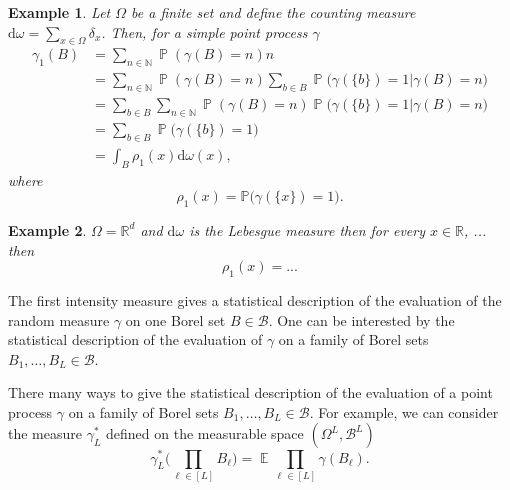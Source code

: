 \documentclass[twoside,11pt]{book}
\newtheorem{example}{Example}
\numberwithin{theorem}{chapter}
\numberwithin{definition}{chapter}
\numberwithin{proposition}{chapter}
\numberwithin{corollary}{chapter}
\numberwithin{example}{chapter}
\numberwithin{lemma}{chapter}
\DeclareMathOperator{\EX}{\mathbb{E}}
\DeclareMathOperator{\Prb}{\mathbb{P}}
\begin{document}
\begin{example}
Let $\Omega$ be a finite set and define the counting measure $\mathrm{d}\omega = \sum\limits_{x \in \Omega} \delta_x$. Then, for a simple point process $\gamma$
\begin{align}
\gamma_1(B) & = \sum\limits_{n \in \mathbb{N}} \Prb(\gamma(B) = n) n\\
& = \sum\limits_{n \in \mathbb{N}} \Prb(\gamma(B) = n) \sum\limits_{b \in B} \Prb \big( \gamma(\{b\}) = 1| \gamma(B) = n \big) \nonumber\\
& = \sum\limits_{b \in B} \sum\limits_{n \in \mathbb{N}} \Prb(\gamma(B) = n)  \Prb \big( \gamma(\{b\}) = 1| \gamma(B) = n \big) \nonumber\\
& = \sum\limits_{b \in B}  \Prb \big( \gamma(\{b\}) = 1\big) \nonumber\\
& = \int_{B} \rho_{1}(x) \mathrm{d}\omega(x), \nonumber
\end{align}
where 
\begin{equation}
\rho_{1}(x) = \mathbb{P} \big(\gamma(\{x\}) = 1 \big).
\end{equation}

\end{example}

\begin{example}
$\Omega = \mathbb{R}^{d}$ and $\mathrm{d}\omega$ is the Lebesgue measure then for every $x \in \mathbb{R}$, ... then
\begin{equation}
\rho_{1}(x) = ...
\end{equation}
\end{example}
The first intensity measure gives a statistical description of the evaluation of the random measure $\gamma$ on one Borel set $B \in \mathcal{B}$. One can be interested by the statistical description of the evaluation of $\gamma$ on a family of Borel sets $B_{1}, \dots, B_{L} \in \mathcal{B}$. 

There many ways to give the statistical description of the evaluation of a point process $\gamma$ on a family of Borel sets $B_{1}, \dots, B_{L} \in \mathcal{B}$. For example, we can consider the measure $\gamma_{L}^{*}$ defined on the measurable space $(\Omega^{L}, \mathcal{B}^{L})$
\begin{equation}
\gamma_{L}^{*} \big( \prod\limits_{\ell \in [L]}B_\ell \big) = \EX \prod\limits_{\ell \in [L]} \gamma(B_\ell).
\end{equation}
\end{document}
